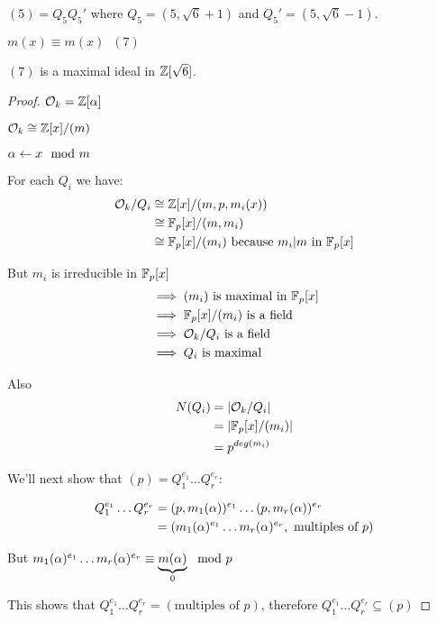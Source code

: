 \documentclass[11pt]{article}
\begin{document}
$(5) = Q_5 Q_5'$ where $Q_5 = (5, \sqrt6 + 1)$ and $Q_5' = (5, \sqrt6 - 1)$.
\spac

$m(x) \equiv m(x) \hspace{7pt} (7)$

$(7) $ is a maximal ideal in $\mathbb{Z}[\sqrt6]$.



\begin{proof}
\spa

	$\mathcal{O}_k = \mathbb{Z}[\alpha]$

	$\mathcal{O}_k \cong \mathbb{Z}[x]/(m) $

	$\alpha \leftarrow x \mod m$
\spa

	For each $Q_i$ we have:
	\begin{align*}
		\mathcal{O}_k /Q_i & \cong \mathbb{Z}[x]/(m,p, m_i(x))\\
		& \cong \mathbb{F}_p[x] / (m,m_i)\\
		&\cong \mathbb{F}_p[x] / (m_i) \text{ because $ m_i | m $ in $\mathbb{F}_p[x]$}
	\end{align*}

But $m_i $ is irreducible in $\mathbb{F}_p[x]$
	\begin{align*}
		& \implies (m_i) \text{ is maximal in } \mathbb{F}_p[x]\\
		& \implies \mathbb{F}_p[x]/(m_i) \text{ is a field }\\
		& \implies \mathcal{O}_k/Q_i \text{ is a field }\\
		& \implies Q_i \text{ is maximal } 
	\end{align*}

	Also \begin{align*}
		N(Q_i) &= |\mathcal{O}_k/Q_i|\\
		& = |\mathbb{F}_p[x] / (m_i)|\\
		& = p^{deg(m_i)}
	\end{align*}

	We'll next show that $(p) = Q_1^{e_1} \dots Q_r^{e_r} $:


	\begin{align*}
		Q_1^{e_1}\dots Q_r^{e_r}  &= (p, m_1(\alpha) )^{e_1} \dots (p, m_r(\alpha) )^{e_r} \\
		& = (m_1(\alpha)^{e_1} \dots m_r(\alpha)^{e_r}, \text{ multiples of } p )
	\end{align*}

	But $m_1 (\alpha) ^{e_1} \dots m_r(\alpha)^{e_r} \equiv \underbrace{m(\alpha)}_0 \mod p$

\spa

	This shows that $Q_1^{e_1} \dots Q_r^{e_r} = (\text{multiples of }p)$, therefore $Q_1^{e_1} \dots Q_r^{e_r} \subseteq (p)$
\spa


\end{proof}
\end{document}
